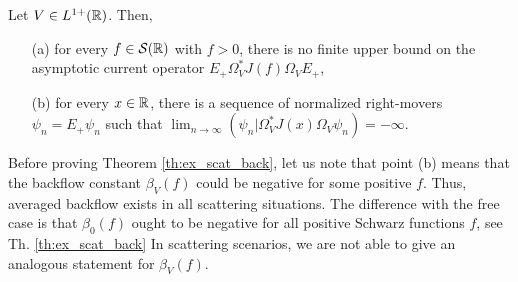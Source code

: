 \begin{theorem}
	\label{th:ex_scat_back}
	Let $V\in L^{1+}({\mathbb R})$. Then,
	\begin{itemize}
		\item[(a)] for every $f\in\mathcal{S}({\mathbb R})$ with $f>0$, there is no finite upper bound on the asymptotic current operator $E_+\Omega_V^*J(f)\Omega_VE_+$,
		\item[(b)] for every $x\in{\mathbb R}$, there is a sequence of normalized right-movers $\psi_n=E_+\psi_n$ such that $\lim_{n\to\infty}(\psi_n|\Omega_V^*J(x)\Omega_V\psi_n)=-\infty$.
	\end{itemize}
\end{theorem}
\begin{oss}
	Before proving Theorem \ref{th:ex_scat_back}, let us note that point (b) means that the backflow constant $\beta_V(f)$ could be negative for some positive $f$. Thus, averaged backflow exists in all scattering situations. The difference with the free case is that $\beta_0(f)$ ought to be negative for all positive Schwarz functions $f$, see Th. \ref{th:ex_scat_back} In scattering scenarios, we are not able to give an analogous statement for $\beta_V(f)$.
\end{oss}

